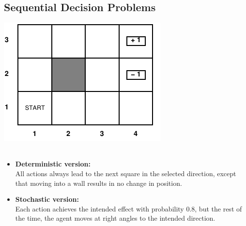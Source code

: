\documentclass{article}
\begin{document}
\subsection{Sequential Decision Problems}
\includegraphics[scale=0.3]{77.png}\\\\
\begin{itemize}
    \item \textbf{Deterministic version:}\\
     All actions always lead to the next square in the selected direction, except that moving into a wall results in no change in position.\\
    \item \textbf{Stochastic version:}\\
     Each action achieves the intended effect with probability 0.8, but the rest of the time, the agent moves at right angles to the intended direction.
\end{itemize}
\end{document}
